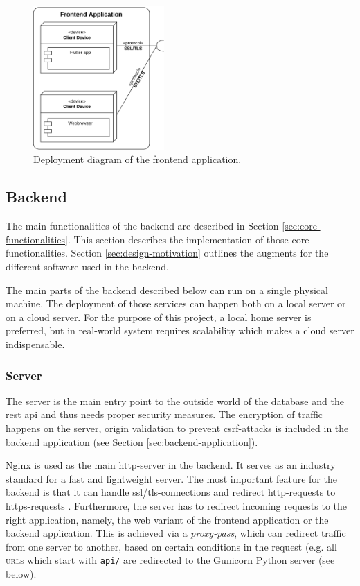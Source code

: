 \begin{figure}[H]
    \centering
    \includegraphics[width=5cm]{images/deployment_diagram_frontend.drawio.png}
    \caption{Deployment diagram of the frontend application.}
    \label{fig:deployment-frontend}
\end{figure}

\clearpage


\subsection{Backend}\label{sec:implementation-backend}
The main functionalities of the backend are described in Section \ref{sec:core-functionalities}. This section describes the implementation of those core functionalities. Section \ref{sec:design-motivation} outlines the augments for the different software used in the backend.

\ind The main parts of the backend described below can run on a single physical machine. The deployment of those services can happen both on a local server or on a cloud server. For the purpose of this project, a local home server is preferred, but in real-world system requires scalability which makes a cloud server indispensable.

\subsubsection{Server}
The server is the main entry point to the outside world of the database and the \ac{rest} \ac{api} and thus needs proper security measures. The encryption of traffic happens on the server, origin validation to prevent \ac{csrf}-attacks is included in the backend application (see Section \ref{sec:backend-application}). 

\ind Nginx is used as the main \ac{http}-server in the backend. It serves as an industry standard for a fast and lightweight server. The most important feature for the backend is that it can handle \ac{ssl}/\ac{tls}-connections and redirect \ac{http}-requests to \ac{https}-requests \cite{nginx}. Furthermore, the server has to redirect incoming requests to the right application, namely, the web variant of the frontend application or the backend application. This is achieved via a \textit{proxy-pass}, which can redirect traffic from one server to another, based on certain conditions in the request (e.g. all \textsc{url}s which start with \texttt{api/} are redirected to the Gunicorn Python server (see below).

